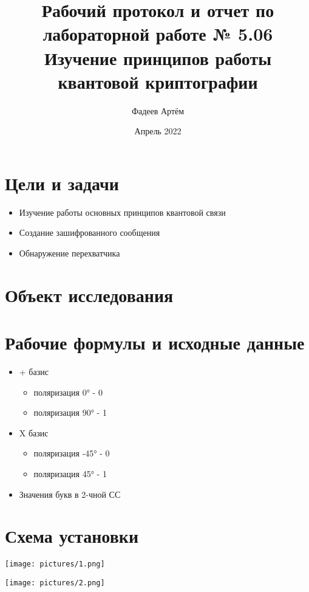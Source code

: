 \documentclass[12pt, a4paper]{article}
\title{Рабочий протокол и отчет по лабораторной работе № 5.06
\\ Изучение принципов работы квантовой криптографии
}
\author{Фадеев Артём }
\date{Апрель 2022}
\begin{document}
\maketitle
\hline

\section{Цели и задачи}

\begin{itemize}
    \item Изучение работы основных принципов квантовой связи
    \item Создание зашифрованного сообщения
    \item Обнаружение перехватчика
\end{itemize}

\section{Объект исследования}



\section{Рабочие формулы и исходные данные}

\begin{itemize}
    \item + базис
    \begin{itemize}
        \item поляризация 0° - 0
        \item поляризация 90° - 1 
    \end{itemize}
    \item X базис
    \begin{itemize}
        \item поляризация -45° - 0
        \item поляризация 45° - 1 
    \end{itemize}
    \item Значения букв в 2-чной СС
\end{itemize}


\section{Схема установки}
\texttt{[image: pictures/1.png]}

\texttt{[image: pictures/2.png]}
\end{document}
